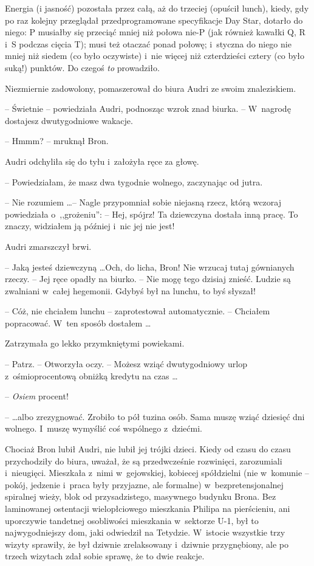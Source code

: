 \documentclass[oneside,polish,11pt,rmheadings]{mwbk}
\begin{document}
Energia (i jasność) pozostała przez całą, aż do trzeciej (opuścił lunch), kiedy, gdy po raz kolejny przeglądał przedprogramowane specyfikacje Day Star, dotarło do niego: P musiałby się przeciąć mniej niż połowa nie-P (jak również kawałki Q, R i~S podczas cięcia T); musi też otaczać ponad połowę; i~styczna do niego nie mniej niż siedem (co było oczywiste) i~nie więcej niż czterdzieści cztery (co było suką!) punktów. Do czegoś \textit{to }prowadziło. 

Niezmiernie zadowolony, pomaszerował do biura Audri ze swoim znaleziskiem. 

-- Świetnie -- powiedziała Audri, podnosząc wzrok znad biurka. -- W~nagrodę dostajesz dwutygodniowe wakacje.  

-- Hmmm? -- mruknął Bron. 

Audri odchyliła się do tyłu i~założyła ręce za głowę.

-- Powiedziałam, że masz dwa tygodnie wolnego, zaczynając od jutra. 

-- Nie rozumiem \ldots  -- Nagle przypomniał sobie niejasną rzecz, którą wczoraj powiedziała o~,,grożeniu'': -- Hej, spójrz! Ta dziewczyna dostała inną pracę. To znaczy, widziałem ją później i~nic jej nie jest! 

Audri zmarszczył brwi. 

-- Jaką jesteś dziewczyną \ldots  Och, do licha, Bron! Nie wrzucaj tutaj gównianych rzeczy. -- Jej ręce opadły na biurko. -- Nie mogę tego dzisiaj znieść. Ludzie są zwalniani w~całej hegemonii. Gdybyś był na lunchu, to byś słyszał! 

-- Cóż, nie chciałem lunchu -- zaprotestował automatycznie. -- Chciałem popracować. W~ten sposób dostałem \ldots  

Zatrzymała go lekko przymkniętymi powiekami. 

-- Patrz. -- Otworzyła oczy. -- Możesz wziąć dwutygodniowy urlop z~ośmioprocentową obniżką kredytu na czas \ldots  

-- \textit{Osiem }procent! 

--  \ldots albo zrezygnować. Zrobiło to pół tuzina osób. Sama muszę wziąć dziesięć dni wolnego. I~muszę wymyślić coś wspólnego z~dziećmi. 

Chociaż Bron lubił Audri, nie lubił jej trójki dzieci. Kiedy od czasu do czasu przychodziły do biura, uważał, że są przedwcześnie rozwinięci, zarozumiali i~nieugięci. Mieszkała z~nimi w~gejowskiej, kobiecej spółdzielni (nie w~komunie -- pokój, jedzenie i~praca były przyjazne, ale formalne) w~bezpretensjonalnej spiralnej wieży, blok od przysadzistego, masywnego budynku Brona. Bez laminowanej ostentacji wielopłciowego mieszkania Philipa na pierścieniu, ani uporczywie tandetnej osobliwości mieszkania w~sektorze U-1, był to najwygodniejszy dom, jaki odwiedził na Tetydzie. W~istocie wszystkie trzy wizyty sprawiły, że był dziwnie zrelaksowany i~dziwnie przygnębiony, ale po trzech wizytach zdał sobie sprawę, że to dwie reakcje. 
\end{document}

